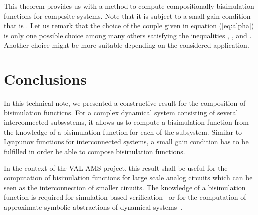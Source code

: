 \documentclass[a4paper,12pt,twoside]{article}
\begin{document}
This theorem provides us with a method to compute compositionally bisimulation functions
for composite systems. Note that it is subject to a small gain condition that is . Let us remark that the choice of the couple  given in equation (\ref{eq:alpha})
is only one possible choice among many others satisfying the inequalities , ,  and . Another choice might be more suitable depending on the considered application.

\section{Conclusions}
In this technical note, we presented a constructive result for the composition of bisimulation functions.
For a complex dynamical system consisting of several interconnected subsystems,
it allows us to compute a bisimulation function from the knowledge of a bisimulation function for each of the subsystem.
Similar to Lyapunov functions for interconnected systems,
a small gain condition has to be fulfilled in order be able to compose bisimulation functions.

In the context of the VAL-AMS project, this result shall be useful for the computation of bisimulation functions for large scale analog circuits which can be seen as the interconnection of smaller circuits.
The knowledge of a bisimulation function is required for simulation-based verification~\cite{Girard06,Girard07a,Julius07,Lerda08}
or for the computation of approximate symbolic abstractions of dynamical systems~\cite{Girard07,Pola07}.






\end{document}
